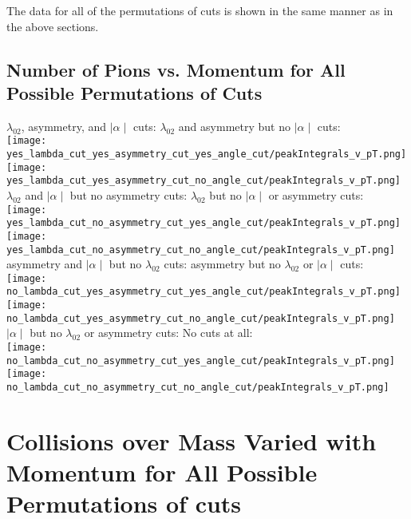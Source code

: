 \documentclass[11pt]{article}
\begin{document}
The data for all of the permutations of cuts is shown in the same manner as in the above sections.

\subsection{Number of Pions vs. Momentum for All Possible Permutations of Cuts} %
\begin{frame}{}
$\lambda_{02}$, asymmetry, and $\mid\alpha\mid$ cuts:
\noindent\hspace{1 cm}$\lambda_{02}$ and asymmetry but no $\mid\alpha\mid$ cuts:\\
\texttt{[image: yes\_lambda\_cut\_yes\_asymmetry\_cut\_yes\_angle\_cut/peakIntegrals\_v\_pT.png]}
\texttt{[image: yes\_lambda\_cut\_yes\_asymmetry\_cut\_no\_angle\_cut/peakIntegrals\_v\_pT.png]}
$\lambda_{02}$ and $\mid\alpha\mid$ but no asymmetry cuts:
\noindent\hspace{1 cm}$\lambda_{02}$ but no $\mid\alpha\mid$ or asymmetry cuts:\\
\texttt{[image: yes\_lambda\_cut\_no\_asymmetry\_cut\_yes\_angle\_cut/peakIntegrals\_v\_pT.png]}
\texttt{[image: yes\_lambda\_cut\_no\_asymmetry\_cut\_no\_angle\_cut/peakIntegrals\_v\_pT.png]}
asymmetry and $\mid\alpha\mid$ but no $\lambda_{02}$ cuts:
\noindent\hspace{1 cm}asymmetry but no $\lambda_{02}$ or $\mid\alpha\mid$ cuts:\\
\texttt{[image: no\_lambda\_cut\_yes\_asymmetry\_cut\_yes\_angle\_cut/peakIntegrals\_v\_pT.png]}
\texttt{[image: no\_lambda\_cut\_yes\_asymmetry\_cut\_no\_angle\_cut/peakIntegrals\_v\_pT.png]}
$\mid\alpha\mid$ but no $\lambda_{02}$ or asymmetry cuts:
\noindent\hspace{1 cm} No cuts at all:\\
\texttt{[image: no\_lambda\_cut\_no\_asymmetry\_cut\_yes\_angle\_cut/peakIntegrals\_v\_pT.png]}
\texttt{[image: no\_lambda\_cut\_no\_asymmetry\_cut\_no\_angle\_cut/peakIntegrals\_v\_pT.png]}
\end{frame}

\section{Collisions over Mass Varied with Momentum for All Possible Permutations of cuts} %
\end{document}
